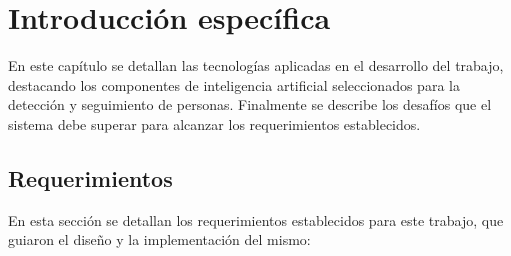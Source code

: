 \chapter{Introducción específica} %

\label{Chapter2}

En este capítulo se detallan las tecnologías aplicadas en el desarrollo del trabajo, destacando los componentes de inteligencia artificial seleccionados para la detección y seguimiento de personas. Finalmente se describe los desafíos que el sistema debe superar para alcanzar los requerimientos establecidos.


\section{Requerimientos}
\label{sec:requerimientos}

En esta sección se detallan los requerimientos establecidos para este trabajo, que guiaron el diseño y la implementación del mismo:

